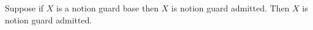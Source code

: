 

\begin{proposition}\label{notion_implication_guard_no_escape}
    Suppose if $X$ is a notion guard base then $X$ is notion guard admitted.
    Then $X$ is notion guard admitted.
\end{proposition}
